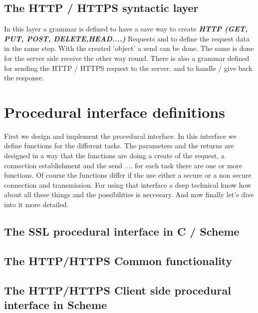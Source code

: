\documentclass[10pt,a4paper,english]{article}
\newcommand{\abbrhighcol}[1]{\textbf{\textit{#1}}}
\begin{document}
\begin{multicols}{2}
\subsection{The HTTP / HTTPS  syntactic layer}
\begin{flushleft}
In this layer a grammar is defined to have a save way to create \abbrhighcol{ HTTP (GET, PUT, POST, DELETE,HEAD....)} Requests and to define the request data in the same step. With the created 'object' a send can be done. The same is done for the server side receive the other way round. There is also a grammar defined for sending the HTTP / HTTPS request to the server. and to handle / give back the response. 
\end{flushleft}


\section{Procedural interface definitions}
\begin{flushleft}
First we design and implement the procedural interface. In this interface we define functions for the different tasks. The parameters and the returns are designed in a way that  the functions are doing a create of the request, a connection establishment and the send .... for each task there  are  one or more functions. Of course the functions differ if the use either a secure or a non secure connection and transmission. For using that interface a deep technical know how about all these things and the possibilities is neccesary.
And now finally let's dive into it more detailed.
\end{flushleft}
\subsection{The SSL procedural interface in C / Scheme}
\begin{flushleft}
\end{flushleft}
\subsection{The HTTP/HTTPS Common functionality}
\begin{flushleft}
\end{flushleft}
\subsection{The HTTP/HTTPS Client side procedural interface in  Scheme}
\begin{flushleft}
\end{flushleft}

\end{multicols}
\end{document}
